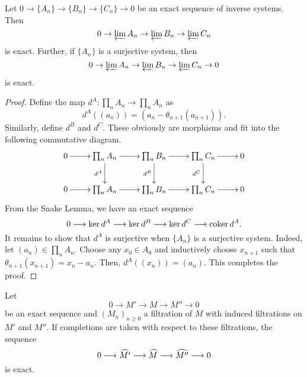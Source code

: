 \begin{proposition}
    Let $0\to\{A_n\}\to\{B_n\}\to\{C_n\}\to0$ be an exact sequence of inverse systems. Then 
    \begin{equation*}
        0\to\varprojlim A_n\to\varprojlim B_n\to\varprojlim C_n
    \end{equation*}
    is exact. Further, if $\{A_n\}$ is a surjective system, then 
    \begin{equation*}
        0\to\varprojlim A_n\to\varprojlim B_n\to\varprojlim C_n\to 0
    \end{equation*}
    is exact.
\end{proposition}
\begin{proof}
    Define the map $d^A: \prod_{n} A_n\to\prod_n A_n$ as 
    \begin{equation*}
        d^A((a_n)) = (a_n - \theta_{n + 1}(a_{n + 1})).
    \end{equation*}
    Similarly, define $d^B$ and $d^C$. These obviously are morphisms and fit into the following commutative diagram. 
    \begin{equation*}
        \xymatrix {
            0\ar[r] & \prod_n A_n\ar[r]\ar[d]_{d^A} & \prod_n B_n\ar[r]\ar[d]_{d^B} & \prod_n C_n\ar[r]\ar[d]_{d^C} & 0\\
            0\ar[r] & \prod_n A_n\ar[r] & \prod_n B_n\ar[r] & \prod_n C_n\ar[r] & 0
        }
    \end{equation*}
    From the Snake Lemma, we have an exact sequence 
    \begin{equation*}
        0\longrightarrow\ker d^A\longrightarrow\ker d^B\longrightarrow \ker d^C\longrightarrow\operatorname{coker} d^A.
    \end{equation*}
    It remains to show that $d^A$ is surjective when $\{A_n\}$ is a surjective system. Indeed, let $(a_n)\in\prod_n A_n$. Choose any $x_0\in A_0$ and inductively choose $x_{n + 1}$ such that $\theta_{n + 1}(x_{n + 1}) = x_n - a_n$. Then, $d^A((x_n)) = (a_n)$. This completes the proof.
\end{proof}

\begin{corollary}
    Let 
    \begin{equation*}
        0\longrightarrow M'\longrightarrow M\longrightarrow M''\longrightarrow 0
    \end{equation*}
    be an exact sequence and $(M_n)_{n\ge 0}$ a filtration of $M$ with induced filtrations on $M'$ and $M''$. If completions are taken with respect to these filtrations, the sequence 
    \begin{equation*}
        0\longrightarrow\widehat{M'}\longrightarrow\widehat{M}\longrightarrow\widehat{M''}\longrightarrow 0
    \end{equation*}
    is exact.
\end{corollary}

